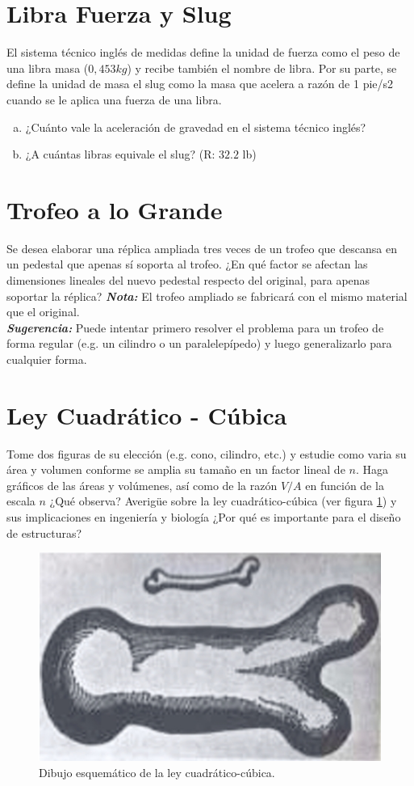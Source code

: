 \documentclass{replab}
\begin{document}
	\section{Libra Fuerza y Slug}
	El sistema técnico inglés de medidas define la unidad de fuerza como el peso de una libra masa ($0,453 kg$) y recibe también el nombre de libra. Por su parte, se define la unidad de masa el slug como la masa que acelera a razón de 1 pie/s2 cuando se le aplica una fuerza de una libra. 

	\begin{enumerate}[a)]
		\item ¿Cuánto vale la aceleración de gravedad en el sistema 
		técnico inglés?
		\item ¿A cuántas libras equivale el slug? (R: $32.2$ lb)
	\end{enumerate}

	\section{Trofeo a lo Grande}
	Se desea elaborar una réplica ampliada tres veces de un trofeo que descansa en un pedestal que apenas sí soporta al trofeo. ¿En qué factor se afectan las dimensiones lineales del nuevo pedestal respecto del original, para apenas soportar la réplica?
	\textit{\textbf{Nota:}} El trofeo ampliado se fabricará con el mismo material que el original. \\
	
	\textit{\textbf{Sugerencia:}} Puede intentar primero resolver el problema para un trofeo de forma regular (e.g. un cilindro o un paralelepípedo) y luego generalizarlo para cualquier forma.

	\section{Ley Cuadrático - Cúbica}
	Tome dos figuras de su elección (e.g. cono, cilindro, etc.) y estudie como varia su área y volumen conforme se amplia su tamaño en un factor lineal de $n$. Haga gráficos de las áreas y volúmenes, así como de la razón $V/A$ en función de la escala $n$ ¿Qué observa? Averigüe sobre la ley cuadrático-cúbica (ver figura \ref{fig:galileo}) y sus implicaciones en ingeniería y biología ¿Por qué es importante para el diseño de estructuras?

	\begin{figure}[htbp]
		\centering
		\includegraphics[width=.5\columnwidth]{imagenes/galileo.jpeg}
		\caption{Dibujo esquemático de la ley cuadrático-cúbica.}
		\label{fig:galileo}
	\end{figure}
\end{document}
